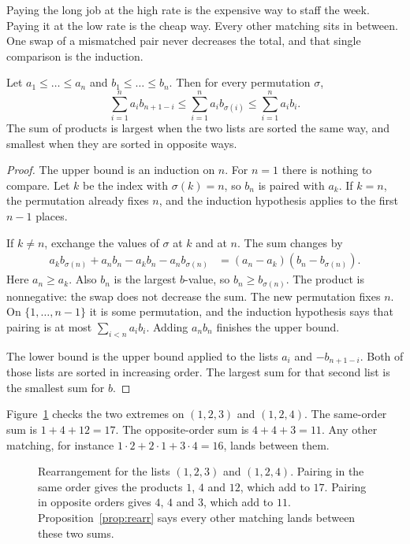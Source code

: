 Paying the long job at the high rate is the expensive way to staff the week. Paying it at the low rate is the cheap way. Every other matching sits in between. One swap of a mismatched pair never decreases the total, and that single comparison is the induction.

\begin{proposition}[rearrangement]\label{prop:rearr}
Let $a_1\le\dots\le a_n$ and $b_1\le\dots\le b_n$. Then for every permutation $\sigma$,
\[
\sum_{i=1}^na_ib_{n+1-i}\le\sum_{i=1}^na_ib_{\sigma(i)}\le\sum_{i=1}^na_ib_i.
\]
The sum of products is largest when the two lists are sorted the same way, and smallest when they are sorted in opposite ways.
\end{proposition}
\begin{proof}
The upper bound is an induction on $n$. For $n=1$ there is nothing to compare. Let $k$ be the index with $\sigma(k)=n$, so $b_n$ is paired with $a_k$. If $k=n$, the permutation already fixes $n$, and the induction hypothesis applies to the first $n-1$ places.

If $k\ne n$, exchange the values of $\sigma$ at $k$ and at $n$. The sum changes by
\begin{align*}
a_kb_{\sigma(n)}+a_nb_n-a_kb_n-a_nb_{\sigma(n)}
&=(a_n-a_k)(b_n-b_{\sigma(n)}).
\end{align*}
Here $a_n\ge a_k$. Also $b_n$ is the largest $b$-value, so $b_n\ge b_{\sigma(n)}$. The product is nonnegative: the swap does not decrease the sum. The new permutation fixes $n$. On $\{1,\dots,n-1\}$ it is some permutation, and the induction hypothesis says that pairing is at most $\sum_{i<n}a_ib_i$. Adding $a_nb_n$ finishes the upper bound.

The lower bound is the upper bound applied to the lists $a_i$ and $-b_{n+1-i}$. Both of those lists are sorted in increasing order. The largest sum for that second list is the smallest sum for $b$.
\end{proof}

Figure~\ref{fig:rearrange} checks the two extremes on $(1,2,3)$ and $(1,2,4)$. The same-order sum is $1+4+12=17$. The opposite-order sum is $4+4+3=11$. Any other matching, for instance $1\cdot2+2\cdot1+3\cdot4=16$, lands between them.

\begin{figure}[ht]
\centering
{}
\caption{Rearrangement for the lists $(1,2,3)$ and $(1,2,4)$. Pairing in the same order gives the products $1$, $4$ and $12$, which add to $17$. Pairing in opposite orders gives $4$, $4$ and $3$, which add to $11$. Proposition~\ref{prop:rearr} says every other matching lands between these two sums.}
\label{fig:rearrange}
\end{figure}

